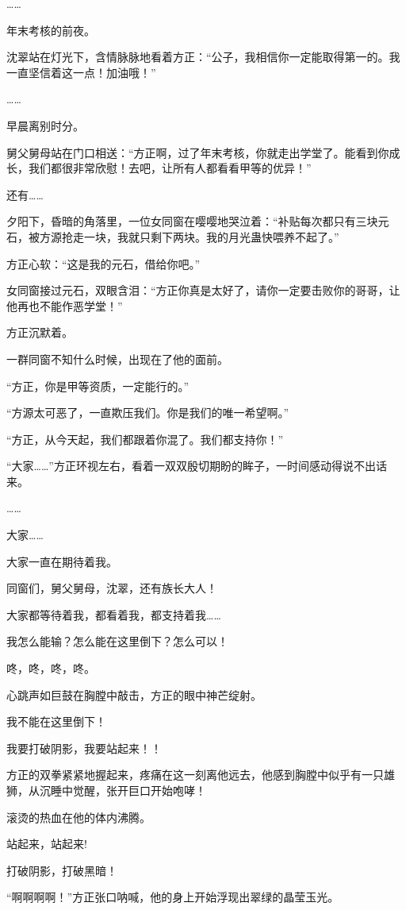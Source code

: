 \begin{this_body}
……

年末考核的前夜。

沈翠站在灯光下，含情脉脉地看着方正：“公子，我相信你一定能取得第一的。我一直坚信着这一点！加油哦！”

……

早晨离别时分。

舅父舅母站在门口相送：“方正啊，过了年末考核，你就走出学堂了。能看到你成长，我们都很非常欣慰！去吧，让所有人都看看甲等的优异！”

还有……

夕阳下，昏暗的角落里，一位女同窗在嘤嘤地哭泣着：“补贴每次都只有三块元石，被方源抢走一块，我就只剩下两块。我的月光蛊快喂养不起了。”

方正心软：“这是我的元石，借给你吧。”

女同窗接过元石，双眼含泪：“方正你真是太好了，请你一定要击败你的哥哥，让他再也不能作恶学堂！”

方正沉默着。

一群同窗不知什么时候，出现在了他的面前。

“方正，你是甲等资质，一定能行的。”

“方源太可恶了，一直欺压我们。你是我们的唯一希望啊。”

“方正，从今天起，我们都跟着你混了。我们都支持你！”

“大家……”方正环视左右，看着一双双殷切期盼的眸子，一时间感动得说不出话来。

……

大家……

大家一直在期待着我。

同窗们，舅父舅母，沈翠，还有族长大人！

大家都等待着我，都看着我，都支持着我……

我怎么能输？怎么能在这里倒下？怎么可以！

咚，咚，咚，咚。

心跳声如巨鼓在胸膛中敲击，方正的眼中神芒绽射。

我不能在这里倒下！

我要打破阴影，我要站起来！！

方正的双拳紧紧地握起来，疼痛在这一刻离他远去，他感到胸膛中似乎有一只雄狮，从沉睡中觉醒，张开巨口开始咆哮！

滚烫的热血在他的体内沸腾。

站起来，站起来!

打破阴影，打破黑暗！

“啊啊啊啊！”方正张口呐喊，他的身上开始浮现出翠绿的晶莹玉光。


\end{this_body}
